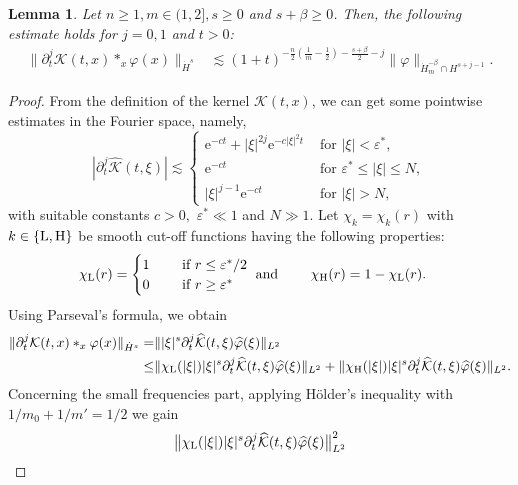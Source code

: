 \documentclass[11pt,reqno]{amsart}
\newtheorem{lemma}{Lemma}[section]
\begin{document}
\begin{lemma}\label{LinearEstimates}
    Let $n \geq 1, m \in (1,2], s \geq 0$ and $s+\beta \geq 0$.  Then, the following estimate holds for $j = 0,1$ and $t > 0$:
    \begin{align*}
        \| \partial_t^j \mathcal{K}(t,x)\ast_x \varphi(x)\|_{\dot{H}^s} 
        &\lesssim (1+t)^{-\frac{n}{2}(\frac{1}{m}-\frac{1}{2})-\frac{s+\beta}{2}-j} \|\varphi\|_{\dot{H}_m^{-\beta} \cap H^{s+j-1}}.
        \end{align*}
\end{lemma}
\begin{proof}
From the definition of the kernel $\mathcal{K}(t,x)$, we can get some pointwise estimates in the Fourier space, namely,
$$
|\partial_t^j \widehat{\mathcal{K}}(t,\xi)|\lesssim \begin{cases}
\mathrm{e}^{-ct}+|\xi|^{2j}\mathrm{e}^{-c|\xi|^2t}&\text{ for } |\xi|< \varepsilon^*,\\
\mathrm{e}^{-ct}&\text{ for } \varepsilon^* \leq|\xi|\leq N,\\
|\xi|^{j-1}\mathrm{e}^{-ct}&\text{ for } |\xi|> N,
\end{cases}
$$
with suitable constants $c>0,$  $\varepsilon^* \ll 1$ and $ N \gg 1$. Let $\chi_k= \chi_k(r)$ with $k\in\{\rm L,H\}$ be smooth cut-off functions having the following properties:
\begin{align*}
&\chi_{\rm L}(r)=
\begin{cases}
1 &\quad \text{ if }r\le \varepsilon^*/2 \\
0 &\quad \text{ if }r\ge \varepsilon^*
\end{cases}
\text{ and } \qquad
\chi_{\rm H}(r)= 1 -\chi_{\rm L}(r).
\end{align*}
Using Parseval's formula, we obtain
\begin{align*}
\|\partial_t^j \mathcal{K}(t,x)\ast_x \varphi(x)\|_{\dot{H}^s} =& \||\xi|^s \partial_t^j \widehat{\mathcal{K}}(t,\xi) \widehat{\varphi}(\xi)\|_{L^2} \\
\leq & \|\chi_{\rm L}(|\xi|)|\xi|^s \partial_t^j \widehat{\mathcal{K}}(t,\xi) \widehat{\varphi}(\xi)\|_{L^2} + \| \chi_{\rm H}(|\xi|)|\xi|^s \partial_t^j \widehat{\mathcal{K}}(t,\xi) \widehat{\varphi}(\xi)\|_{L^2}.  
\end{align*}
Concerning the small frequencies part,
applying H\"{o}lder's inequality with $1/m_0 + 1/m' = 1/2$ we gain
\begin{align*}
    \big\|\chi_{\rm L}(|\xi|)|\xi|^{s}\partial_t^j\widehat{\mathcal{K}}(t,\xi) \widehat{\varphi}(\xi)\big\|^2_{L^2} 

\end{align*}
\end{proof}
\end{document}
